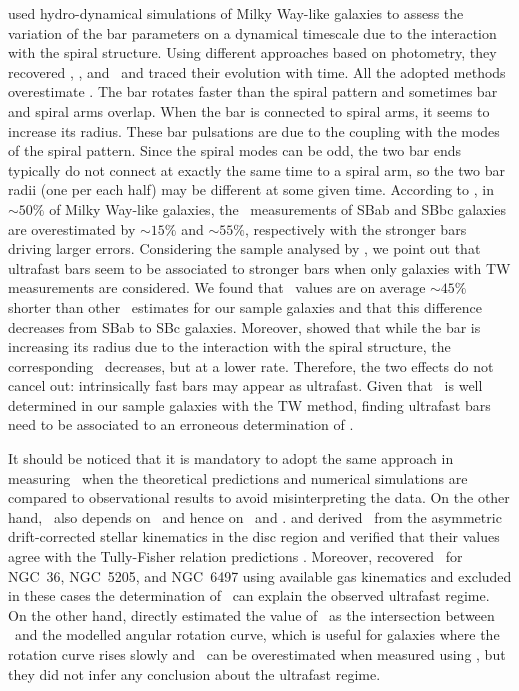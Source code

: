 \documentclass{aa}
\begin{document}
\cite{Hilmi2020} used hydro-dynamical simulations of Milky Way-like galaxies to assess the variation of the bar parameters on a dynamical timescale due to the interaction with the spiral structure. Using different approaches based on photometry, they recovered \rbar, \sbar, and \omegabar\ and traced their evolution with time. All the adopted methods overestimate \rbar. The bar rotates faster than the spiral pattern and sometimes bar and spiral arms overlap. When the bar is connected to spiral arms, it seems to increase its radius. These bar pulsations are due to the coupling with the modes of the spiral pattern. Since the spiral modes can be odd, the two bar ends typically do not connect at exactly the same time to a spiral arm, so the two bar {\rm radii} (one per each half) may be different at some given time. According to \cite{Hilmi2020}, in $\sim 50\%$ of Milky Way-like galaxies, the \rbar\ measurements of SBab and SBbc galaxies are overestimated by $\sim 15\%$ and $\sim 55\%$, respectively with the stronger bars driving larger errors. Considering the sample analysed by \cite{Cuomo2020}, we point out that ultrafast bars seem to be associated to stronger bars when only galaxies with TW measurements are considered. We found that \rqb\ values are on average $\sim45\%$ shorter than other \rbar\ estimates for our sample galaxies and that this difference decreases from SBab to SBc galaxies. Moreover, \cite{Hilmi2020} showed that while the bar is increasing its radius due to the interaction with the spiral structure, the corresponding \omegabar\ decreases, but at a lower rate. Therefore, the two effects do not cancel out: intrinsically fast bars may appear as ultrafast. Given that \omegabar\ is well determined in our sample galaxies with the TW method, finding ultrafast bars need to be associated to an erroneous determination of \rbar.

It should be noticed that it is mandatory to adopt the same approach in measuring \rbar\ when the theoretical predictions \citep{weinberg1985,Hernquist1992} and numerical simulations \citep{Debattista2000,Zou2019,Ghafourian2020} are compared to observational results to avoid misinterpreting the data. On the other hand, \rr\ also depends on \rcor\ and hence on \omegabar\ and \vcirc. \citet{Aguerri2015} and \citet{Cuomo2019b} derived \vcirc\ from the asymmetric drift-corrected stellar kinematics in the disc region \citep{Binney2008} and verified that their values agree with the Tully-Fisher relation predictions \citep{Tully1977,Reyes2011}. Moreover, \citet{Aguerri2015} recovered \vcirc\ for NGC~36, NGC~5205, and NGC~6497 using available gas kinematics \citep{Theureau1998,Garcia-Lorenzo2015} and excluded in these cases the determination of \vcirc\ can explain the observed ultrafast regime. On the other hand, \citet{Garma-Oehmichen2020} directly estimated the value of \rcor\ as the intersection between \omegabar\ and the modelled angular rotation curve, which is useful for galaxies where the rotation curve rises slowly and \rcor\ can be overestimated when measured using \vcirc, but they did not infer any conclusion about the ultrafast regime. 
\end{document}
